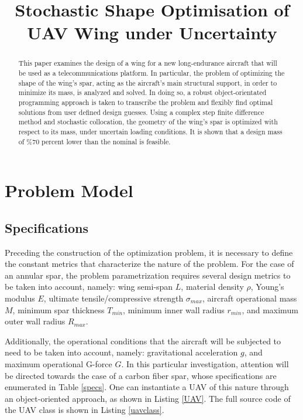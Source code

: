 \documentclass{article}
\title{Stochastic Shape Optimisation of UAV Wing under Uncertainty}
\begin{document}
\maketitle

\begin{abstract}
    This paper examines the design of a wing for a new long-endurance aircraft that will be used as a telecommunications platform. In particular, the problem of optimizing the shape of the wing's spar, acting as the aircraft's main structural support, in order to minimize its mass, is analyzed and solved. In doing so, a robust object-orientated programming approach is taken to transcribe the problem and flexibly find optimal solutions from user defined design guesses. Using a complex step finite difference method and stochastic collocation, the geometry of the wing's spar is optimized with respect to its mass, under uncertain loading conditions. It is shown that a design mass of \%70 percent lower than the nominal is feasible.
\end{abstract}
    

\tableofcontents
\listoftables
\listoffigures
\lstlistoflistings

\section{Problem Model}
\subsection{Specifications}
Preceding the construction of the optimization problem, it is necessary to define the constant metrics that characterize the nature of the problem. For the case of an annular spar, the problem parametrization requires several design metrics to be taken into account, namely: wing semi-span $L$, material density $\rho$, Young's modulus $E$, ultimate tensile/compressive strength $\sigma_{max}$, aircraft operational mass $M$, minimum spar thickness $T_{min}$, minimum inner wall radius $r_{min}$, and maximum outer wall radius $R_{max}$. 

Additionally, the operational conditions that the aircraft will be subjected to need to be taken into account, namely: gravitational acceleration $g$, and maximum operational G-force $G$. In this particular investigation, attention will be directed towards the case of a carbon fiber spar, whose specifications are enumerated in Table \ref{specs}. One can instantiate a UAV of this nature through an object-oriented approach, as shown in Listing \ref{UAV}. The full source code of the UAV class is shown in Listing \ref{uavclass}.
\end{document}
